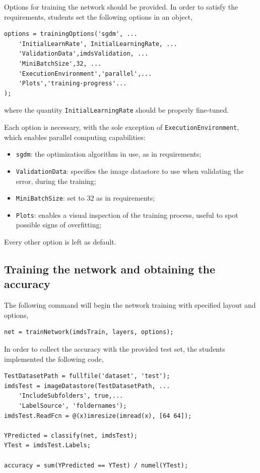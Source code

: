 \documentclass[a4paper, 11pt]{article} %
\begin{document}
Options for training the network should be provided. In order to satisfy the requirements, students set the following options in an object,

\begin{lstlisting}
options = trainingOptions('sgdm', ...
    'InitialLearnRate', InitialLearningRate, ...
    'ValidationData',imdsValidation, ... 
    'MiniBatchSize',32, ...
    'ExecutionEnvironment','parallel',...
    'Plots','training-progress'...
);

\end{lstlisting}

where the quantity \texttt{InitialLearningRate} should be properly fine-tuned.

Each option is necessary, with the sole exception of \texttt{ExecutionEnvironment}, which enables parallel computing capabilities:

\begin{itemize}
    \item \texttt{sgdm}: the optimization algorithm in use, as in requirements; 
    \item \texttt{ValidationData}: specifies the image datastore to use when validating the error, during the training;
    \item \texttt{MiniBatchSize}: set to $32$ as in requirements;
    \item \texttt{Plots}: enables a visual inspection of the training process, useful to spot possible signs of overfitting;
\end{itemize}

Every other option is left as default.

\subsection{Training the network and obtaining the accuracy}

The following command will begin the network training with specified layout and options,

\begin{lstlisting}
net = trainNetwork(imdsTrain, layers, options);
\end{lstlisting} 

In order to collect the accuracy with the provided test set, the students implemented the following code,

\begin{lstlisting}
TestDatasetPath = fullfile('dataset', 'test');
imdsTest = imageDatastore(TestDatasetPath, ...
    'IncludeSubfolders', true,...
    'LabelSource', 'foldernames');
imdsTest.ReadFcn = @(x)imresize(imread(x), [64 64]);

YPredicted = classify(net, imdsTest);
YTest = imdsTest.Labels;

accuracy = sum(YPredicted == YTest) / numel(YTest);
\end{lstlisting}
\end{document}

